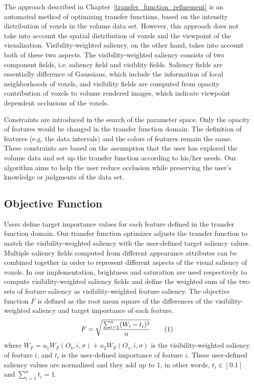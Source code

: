 The approach described in Chapter~\ref{transfer_function_refinement} is an automated method of optimizing transfer functions, based on the intensity distribution of voxels in the volume data set. However, this approach does not take into account the spatial distribution of voxels and the viewpoint of the visualization. Visibility-weighted saliency, on the other hand, takes into account both of these two aspects. The visibility-weighted saliency consists of two component fields, i.e. saliency field and visiblity fields. Saliency fields are essentially difference of Gaussians, which include the information of local neighborhoods of voxels, and visibility fields are computed from opacity contribution of voxels to volume rendered images, which indicate viewpoint dependent occlusions of the voxels.

Constraints are introduced in the search of the parameter space. Only the opacity of features would be changed in the transfer function domain. The definition of features (e.g. the data intervals) and the colors of features remain the same.
These constraints are based on the assumption that the user has explored the volume data and set up the transfer function according to his/her needs. Our algorithm aims to help the user reduce occlusion while preserving the user's knowledge or judgments of the data set.

\subsection{Objective Function}
Users define target importance values for each feature defined in the transfer function domain.
Our transfer function optimizer adjusts the transfer function to match the visibility-weighted saliency with the user-defined target saliency values.
Multiple saliency fields computed from different appearance attributes can be combined together in order to represent different aspects of the visual saliency of voxels.
In our implementation, brightness and saturation are used respectively to compute visibility-weighted saliency fields and define the weighted sum of the two sets of feature saliency as visibility-weighted feature saliency.
The objective function $ F $ is defined as the root mean square of the differences of the visibility-weighted saliency and target importance of each feature.
\[ F=\sqrt{ \frac{\sum_{i=1}^{n} (W_{i}-t_{i})^{2}}{n} } 
\addtag \]
where $ W_{F}=u_{1}W_{F}(O_{b},i,\sigma)+u_{2}W_{F}(O_{s},i,\sigma) $ is the visibility-weighted saliency of feature $ i $, and $ t_{i} $ is the user-defined importance of feature $ i $. These user-defined saliency values are normalized and they add up to 1, in other words, $ t_{i} \in [0.1] $ and $ \sum_{i=1}^{n} t_{i} = 1 $.

